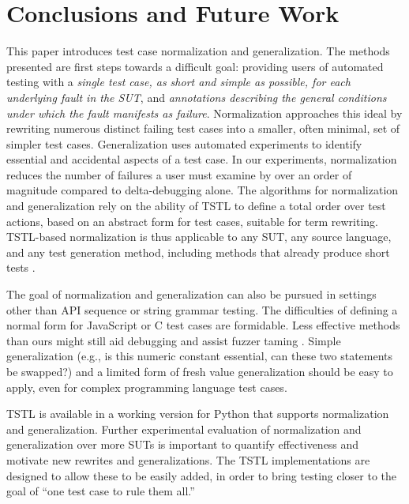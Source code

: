 \section{Conclusions and Future Work}

This paper introduces test case normalization and generalization.  The
methods presented are first steps towards a difficult goal: providing
users of automated testing with a \emph{single test case, as short and
  simple as possible, for each underlying fault in the SUT}, and
\emph{annotations describing the general conditions under which the
  fault manifests as failure}.  Normalization approaches this ideal by
rewriting numerous distinct failing test cases into a smaller, often
minimal, set of simpler test cases.  Generalization uses
automated experiments to identify essential and accidental aspects of
a test case.   In our experiments, normalization reduces the
number of failures a user must examine by over an order of magnitude
compared to delta-debugging alone.  The algorithms for normalization and generalization rely
on the ability of TSTL \cite{NFM15,ISSTA15} to define a total order
over test actions, based on an abstract form for test cases, suitable
for term rewriting.  TSTL-based normalization is thus applicable to
any SUT, any source language, and any test generation method,
including methods that already produce short tests
\cite{FA11,SoftBET}. 


 The goal of normalization and generalization can also be pursued in
settings other than API sequence or string grammar testing.  The
difficulties of defining a normal form for JavaScript \cite{jsfunfuzz}
or C \cite{CReduce} test cases are formidable. Less effective methods
than ours might still aid debugging and assist fuzzer taming
\cite{PLDI13}.  Simple generalization (e.g., is this numeric constant
essential, can these two statements be swapped?) and a limited form of
fresh value generalization should be easy to apply, even for complex
programming language test cases.  

TSTL is available in a working version for Python \cite{tstl} that
supports normalization and generalization.  Further experimental
evaluation of normalization and generalization over more SUTs is
important to quantify effectiveness and motivate new rewrites and
generalizations.  The TSTL implementations are designed to allow these
to be easily added, in order to bring testing closer to the
goal of ``one test case to rule them all.''
